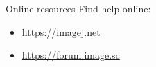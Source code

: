 \documentclass[ignorenonframetext,aspectratio=169,10pt,xcolor=table]{beamer}
\begin{document}
\begin{frame}{Online resources}
  Find help online:
  \begin{itemize}
    \item \url{https://imagej.net}
    \item \url{https://forum.image.sc}
  \end{itemize}

\end{frame}
\end{document}
